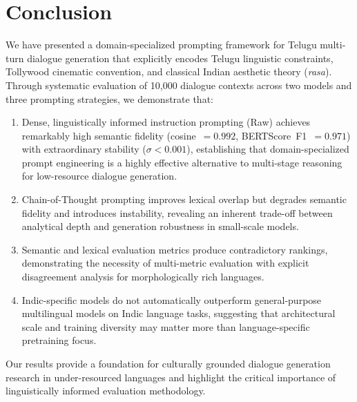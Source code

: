 \documentclass[11pt]{article}
\begin{document}
\section{Conclusion}
\label{sec:conclusion}

We have presented a domain-specialized prompting framework for Telugu multi-turn dialogue generation that explicitly encodes Telugu linguistic constraints, Tollywood cinematic convention, and classical Indian aesthetic theory (\textit{rasa}). Through systematic evaluation of 10,000 dialogue contexts across two models and three prompting strategies, we demonstrate that:

\begin{enumerate}[leftmargin=*,itemsep=2pt]
    \item Dense, linguistically informed instruction prompting (Raw) achieves remarkably high semantic fidelity (cosine~$= 0.992$, BERTScore~F1~$= 0.971$) with extraordinary stability ($\sigma < 0.001$), establishing that domain-specialized prompt engineering is a highly effective alternative to multi-stage reasoning for low-resource dialogue generation.
    
    \item Chain-of-Thought prompting improves lexical overlap but degrades semantic fidelity and introduces instability, revealing an inherent trade-off between analytical depth and generation robustness in small-scale models.
    
    \item Semantic and lexical evaluation metrics produce contradictory rankings, demonstrating the necessity of multi-metric evaluation with explicit disagreement analysis for morphologically rich languages.
    
    \item Indic-specific models do not automatically outperform general-purpose multilingual models on Indic language tasks, suggesting that architectural scale and training diversity may matter more than language-specific pretraining focus.
\end{enumerate}

Our results provide a foundation for culturally grounded dialogue generation research in under-resourced languages and highlight the critical importance of linguistically informed evaluation methodology.

\end{document}
